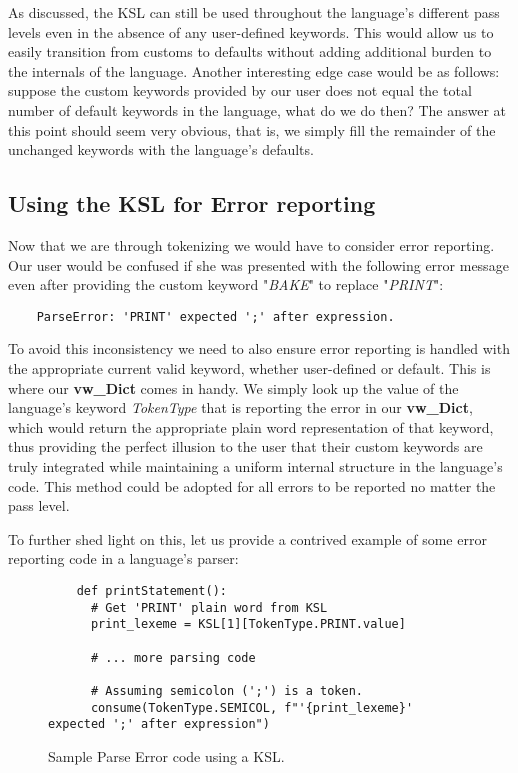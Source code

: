 \documentclass{article}
\begin{document}
As discussed, the KSL can still be used throughout the language's different pass levels even in the absence of any user-defined keywords. This would allow us to easily transition from customs to defaults without adding additional burden to the internals of the language. Another interesting edge case would be as follows: suppose the custom keywords provided by our user does not equal the total number of default keywords in the language, what do we do then? The answer at this point should seem very obvious, that is, we simply fill the remainder of the unchanged keywords with the language's defaults.

\subsection{Using the KSL for Error reporting}

Now that we are through tokenizing we would have to consider error reporting. Our user would be confused if she was presented with the following error message even after providing the custom keyword "\textit{BAKE}" to replace "\textit{PRINT}":

\begin{verbatim}
    ParseError: 'PRINT' expected ';' after expression.
\end{verbatim}

To avoid this inconsistency we need to also ensure error reporting is handled with the appropriate current valid keyword, whether user-defined or default. This is where our \textbf{vw\_Dict} comes in handy. We simply look up the value of the language's keyword \textit{TokenType} that is reporting the error in our \textbf{vw\_Dict}, which would return the appropriate plain word representation of that keyword, thus providing the perfect illusion to the user that their custom keywords are truly integrated while maintaining a uniform internal structure in the language's code. This method could be adopted for all errors to be reported no matter the pass level.

To further shed light on this, let us provide a contrived example of some error reporting code in a language's parser:

\begin{figure}[ht]
  \begin{verbatim}
    def printStatement():
      # Get 'PRINT' plain word from KSL
      print_lexeme = KSL[1][TokenType.PRINT.value]

      # ... more parsing code

      # Assuming semicolon (';') is a token.
      consume(TokenType.SEMICOL, f"'{print_lexeme}' expected ';' after expression")
  \end{verbatim}
  \caption{Sample Parse Error code using a KSL.}
  \label{fig:parse-error-code}
\end{figure}
\end{document}
